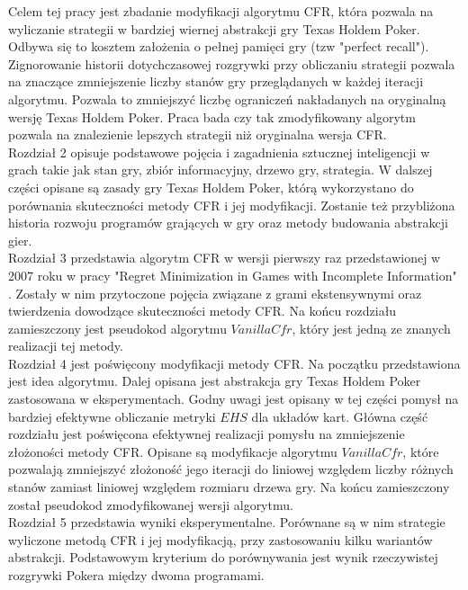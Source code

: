 \documentclass[licencjacka]{pracamgr}
\begin{document}
\noindent
Celem tej pracy jest zbadanie modyfikacji algorytmu CFR, która pozwala na wyliczanie strategii w bardziej wiernej
abstrakcji gry Texas Holdem Poker. Odbywa się to kosztem założenia o pełnej pamięci gry (tzw "perfect recall").
Zignorowanie historii dotychczasowej rozgrywki przy obliczaniu strategii pozwala na znaczące zmniejszenie liczby
stanów gry przeglądanych w każdej iteracji algorytmu. Pozwala to zmniejszyć liczbę ograniczeń nakładanych
na oryginalną wersję Texas Holdem Poker. Praca bada czy tak zmodyfikowany algorytm pozwala na znalezienie
lepszych strategii niż oryginalna wersja CFR. \\

\noindent
Rozdział 2 opisuje podstawowe pojęcia i zagadnienia sztucznej inteligencji w grach takie jak
stan gry, zbiór informacyjny, drzewo gry, strategia. W dalszej części opisane są zasady gry
Texas Holdem Poker, którą wykorzystano do porównania skuteczności metody CFR i jej modyfikacji.
Zostanie też przybliżona historia rozwoju programów grających w gry oraz metody budowania abstrakcji gier. \\

\noindent
Rozdział 3 przedstawia algorytm CFR w wersji pierwszy raz przedstawionej w 2007 roku w pracy
"Regret Minimization in Games with Incomplete Information" \cite{cfr}. Zostały w nim przytoczone pojęcia
związane z grami ekstensywnymi oraz twierdzenia dowodzące skuteczności metody CFR. Na końcu rozdziału
zamieszczony jest pseudokod algorytmu $VanillaCfr$, który jest jedną ze znanych realizacji tej metody. \\

\noindent
Rozdział 4 jest poświęcony modyfikacji metody CFR. Na początku przedstawiona jest idea algorytmu.
Dalej opisana jest abstrakcja gry Texas Holdem Poker zastosowana w eksperymentach. Godny uwagi
jest opisany w tej części pomysł na bardziej efektywne obliczanie metryki $EHS$ dla układów kart.
Główna część rozdziału jest poświęcona efektywnej realizacji pomysłu na zmniejszenie złożoności
metody CFR. Opisane są modyfikacje algorytmu $VanillaCfr$, które pozwalają zmniejszyć złożoność
jego iteracji do liniowej względem liczby różnych stanów zamiast liniowej względem rozmiaru drzewa gry.
Na końcu zamieszczony został pseudokod zmodyfikowanej wersji algorytmu. \\

\noindent
Rozdział 5 przedstawia wyniki eksperymentalne. Porównane są w nim strategie wyliczone metodą
CFR i jej modyfikacją, przy zastosowaniu kilku wariantów abstrakcji. Podstawowym kryterium
do porównywania jest wynik rzeczywistej rozgrywki Pokera między dwoma programami. \\
\end{document}
